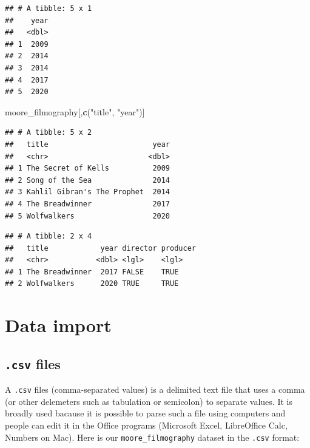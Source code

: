 \documentclass[
]{book}
\newenvironment{Shaded}{\begin{snugshade}}{\end{snugshade}}
\newcommand{\DecValTok}[1]{\textcolor[rgb]{0.00,0.00,0.81}{#1}}
\newcommand{\KeywordTok}[1]{\textcolor[rgb]{0.13,0.29,0.53}{\textbf{#1}}}
\newcommand{\NormalTok}[1]{#1}
\newcommand{\OperatorTok}[1]{\textcolor[rgb]{0.81,0.36,0.00}{\textbf{#1}}}
\newcommand{\StringTok}[1]{\textcolor[rgb]{0.31,0.60,0.02}{#1}}
\begin{document}
\begin{verbatim}
## # A tibble: 5 x 1
##    year
##   <dbl>
## 1  2009
## 2  2014
## 3  2014
## 4  2017
## 5  2020
\end{verbatim}

\begin{Shaded}
\begin{Highlighting}[]
\NormalTok{moore_filmography[,}\KeywordTok{c}\NormalTok{(}\StringTok{"title"}\NormalTok{, }\StringTok{"year"}\NormalTok{)]}
\end{Highlighting}
\end{Shaded}

\begin{verbatim}
## # A tibble: 5 x 2
##   title                        year
##   <chr>                       <dbl>
## 1 The Secret of Kells          2009
## 2 Song of the Sea              2014
## 3 Kahlil Gibran's The Prophet  2014
## 4 The Breadwinner              2017
## 5 Wolfwalkers                  2020
\end{verbatim}

\begin{Shaded}
\end{Shaded}

\begin{verbatim}
## # A tibble: 2 x 4
##   title            year director producer
##   <chr>           <dbl> <lgl>    <lgl>   
## 1 The Breadwinner  2017 FALSE    TRUE    
## 2 Wolfwalkers      2020 TRUE     TRUE
\end{verbatim}

\hypertarget{data-import}{%
\section{Data import}\label{data-import}}

\hypertarget{csv-files}{%
\subsection{\texorpdfstring{\texttt{.csv} files}{.csv files}}\label{csv-files}}

A \texttt{.csv} files (comma-separated values) is a delimited text file that uses a comma (or other delemeters such as tabulation or semicolon) to separate values. It is broadly used bacause it is possible to parse such a file using computers and people can edit it in the Office programs (Microsoft Excel, LibreOffice Calc, Numbers on Mac). Here is our \texttt{moore\_filmography} dataset in the \texttt{.csv} format:
\end{document}
